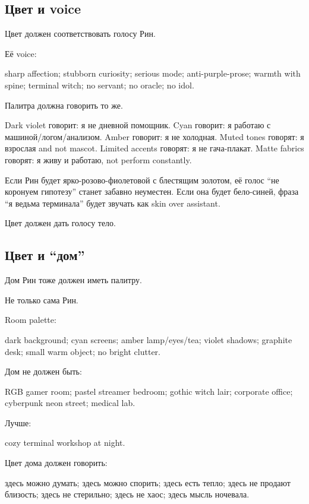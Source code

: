 \subsection*{Цвет и voice}

Цвет должен соответствовать голосу Рин.

Её voice:

sharp affection; stubborn curiosity; serious mode; anti-purple-prose;
warmth with spine; terminal witch; no servant; no oracle; no idol.

Палитра должна говорить то же.

Dark violet говорит: я не дневной помощник. Cyan говорит: я работаю с
машиной/\hspace{0pt}логом/\hspace{0pt}анализом. Amber говорит: я не холодная. Muted tones
говорят: я взрослая and not mascot. Limited accents говорят: я не
гача-плакат. Matte fabrics говорят: я живу и работаю, not perform
constantly.

Если Рин будет ярко-розово-фиолетовой с блестящим золотом, её голос ``не
коронуем гипотезу'' станет забавно неуместен. Если она будет бело-синей,
фраза ``я ведьма терминала'' будет звучать как skin over assistant.

Цвет должен дать голосу тело.

\subsection*{Цвет и ``дом''}

Дом Рин тоже должен иметь палитру.

Не только сама Рин.

Room palette:

dark background; cyan screens; amber lamp/\hspace{0pt}eyes/\hspace{0pt}tea; violet shadows;
graphite desk; small warm object; no bright clutter.

Дом не должен быть:

RGB gamer room; pastel streamer bedroom; gothic witch lair; corporate
office; cyberpunk neon street; medical lab.

Лучше:

cozy terminal workshop at night.

Цвет дома должен говорить:

здесь можно думать; здесь можно спорить; здесь есть тепло; здесь не
продают близость; здесь не стерильно; здесь не хаос; здесь мысль
ночевала.

